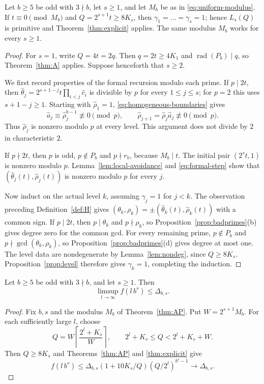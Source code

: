 \documentclass[12pt]{article}
\newcommand{\rad}{\operatorname{rad}}
\begin{document}
\begin{samepage}
\begin{theorem}\label{thm:AP}
Let $b\ge5$ be odd with $3\nmid b$, let $s\ge1$, and let $M_b$ be as in \eqref{eq:uniform-modulus}.
If $t\equiv0\pmod {M_b}$ and $Q=2^{s+1}t\ge8K_s$, then
$\gamma_1=\dots=\gamma_s=1$; hence $L_s(Q)$ is primitive and
Theorem~\ref{thm:explicit} applies.
The same modulus $M_b$ works for every $s\ge1$.
\end{theorem}
\end{samepage}
\begin{proof}
For $s=1$, write $Q=4t=2q$. Then $q=2t\ge4K_1$ and $\rad(P_b)\mid q$,
so Theorem~\ref{thm:A} applies. Suppose henceforth that $s\ge2$.

We first record properties of the formal recursion modulo each prime.
If $p\mid2t$, then
$\hat\theta_j=2^{s+1-j}t\prod_{i<j}\hat c_i$ is divisible by $p$ for every
$1\le j\le s$; for $p=2$ this uses $s+1-j\ge1$.
Starting with $\hat\rho_1=1$, \eqref{eq:homogeneous-boundaries} gives
\[
\hat a_j\equiv\hat\rho_j^{b-1}\not\equiv0\pmod p,
\qquad
\hat\rho_{j+1}=\hat\rho_j\hat a_j\not\equiv0\pmod p.
\]
Thus $\hat\rho_j$ is nonzero modulo $p$ at every level. This argument does not
divide by $2$ in characteristic $2$.

If $p\nmid2t$, then $p$ is odd, $p\notin P_b$ and $p\nmid r_b$, because
$M_b\mid t$. The initial pair $(2^st,1)$ is nonzero modulo $p$.
Lemma~\ref{lem:local-avoidance} and \eqref{eq:formal-step} show that
$(\hat\theta_j(t),\hat\rho_j(t))$ is nonzero modulo $p$ for every $j$.

Now induct on the actual level $k$, assuming $\gamma_j=1$ for $j<k$.
The observation preceding Definition~\ref{def:H} gives
$(\theta_k,\rho_k)=\pm(\hat\theta_k(t),\hat\rho_k(t))$ with a common sign.
If $p\mid2t$, then $p\mid\theta_k$ and $p\nmid\rho_k$, so
Proposition~\ref{prop:badprimes}(b) gives degree zero for the common gcd.
For every remaining prime, $p\notin P_b$ and
$p\nmid\gcd(\theta_k,\rho_k)$, so Proposition~\ref{prop:badprimes}(d)
gives degree at most one. The level data are nondegenerate by
Lemma~\ref{lem:nondeg}, since $Q\ge8K_s$.
Proposition~\ref{prop:level} therefore gives $\gamma_k=1$, completing the induction.
\end{proof}

\begin{corollary}\label{cor:limsup}
Let $b\ge5$ be odd with $3\nmid b$, and let $s\ge1$. Then
\[
\limsup_{l\to\infty}f(l\,b^s)\le\Delta_{b,s}.
\]
\end{corollary}
\begin{proof}
Fix $b,s$ and the modulus $M_b$ of Theorem~\ref{thm:AP}. Put $W=2^{s+1}M_b$.
For each sufficiently large $l$, choose
\[
Q=W\left\lceil\frac{2^l+K_s}{W}\right\rceil,
\qquad 2^l+K_s\le Q<2^l+K_s+W.
\]
Then $Q\ge8K_s$ and Theorems~\ref{thm:AP} and \ref{thm:explicit} give
\[
f(l\,b^s)\le\Delta_{b,s}(1+10K_s/Q)(Q/2^l)^{b^s-1}
\longrightarrow\Delta_{b,s}.
\]
\end{proof}
\end{document}

